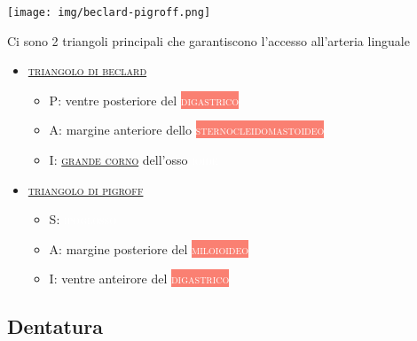\documentclass[italian,]{article}
\providecommand{\tightlist}{%
  \setlength{\itemsep}{0pt}\setlength{\parskip}{0pt}}
\newcommand{\mus}[1]{\colorbox{Salmon}{\textcolor{white}{\textsc{#1}}}}
\newcommand{\oss}[1]{\colorbox{ossa}{\textcolor{white}{\textsc{#1}}}}
\newcommand{\ner}[1]{\colorbox{Dandelion}{\textcolor{white}{\textsc{#1}}}}
\renewcommand{\a}[1]{\underline{\textsc{#1}}}
\newcommand{\normalbox}[2]{\begin{tcolorbox}[title=#1]#2\end{tcolorbox}} %
\begin{document}
\normalbox{I triangoli della zona sopraioidea, label=lbltriangolilinguali}{

\texttt{[image: img/beclard-pigroff.png]}

Ci sono 2 triangoli principali che garantiscono l'accesso all'arteria
linguale

\begin{itemize}
\tightlist
\item \a{triangolo di beclard}~
  \begin{itemize}
  \tightlist
  \item P: ventre posteriore del \mus{digastrico}
  \item A: margine anteriore dello \mus{sternocleidomastoideo}
  \item I: \a{grande corno} dell'osso \oss{ioide}
  \end{itemize}
\item \a{triangolo di pigroff}~
  \begin{itemize}
  \tightlist
  \item S: \ner{ipoglosso}
  \item A: margine posteriore del \mus{miloioideo}
  \item I: ventre anteirore del \mus{digastrico}
  \end{itemize}
\end{itemize}
}

\hypertarget{dentatura}{%
\subsection{Dentatura}\label{dentatura}}
\end{document}
